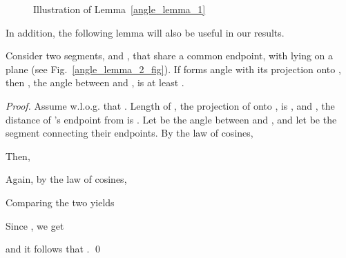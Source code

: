 \begin{figure}[t]
\begin{center}
  \end{center}
  \caption{Illustration of Lemma~\ref{angle_lemma_1}}
  \label{angle_lemma_1_fig}
\end{figure}
 
In addition, the following lemma will also be useful in our results.

\begin{lemma}
\label{angle_lemma_2}
Consider two segments,  and , that share a common endpoint,
with  lying on a plane  (see Fig.~\ref{angle_lemma_2_fig}).
If  forms angle  with its projection onto ,
then , the angle between  and ,
is at least .
\end{lemma}
\begin{proof}
Assume w.l.o.g. that . Length of , the projection of 
onto , is , and , the distance of 's endpoint
from  is . Let  be the angle between  and ,
and let  be the segment connecting their endpoints. By the law of cosines,

Then,

Again, by the law of cosines,

Comparing the two yields

Since , we get

and it follows that .
\qed
\end{proof}

